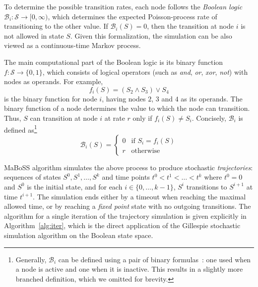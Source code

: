\documentclass[sn-mathphys-num]{sn-jnl}%
\begin{document}
To determine the possible transition rates, each node follows the \emph{Boolean logic} $\mathcal{B}_i: \mathcal{S} \rightarrow [0, \infty)$, which determines the expected Poisson-process rate of transitioning to the other value. If $\mathcal{B}_i(S) = 0$, then the transition at node $i$ is not allowed in state $S$. 
Given this formalization, the simulation can be also viewed as a continuous-time Markov process.

The main computational part of the Boolean logic is its binary function $f: \mathcal{S} \rightarrow \{0, 1\}$, which consists of logical operators (such as \emph{and}, \emph{or}, \emph{xor}, \emph{not}) with nodes as operands. For example, 
\begin{equation}
    f_i(S) = (S_2 \land S_3) \lor S_4 
\end{equation}
is the binary function for node $i$, having nodes $2$, $3$ and $4$ as its operands.
The binary function of a node determines the value to which the node can transition. Thus, $S$ can transition at node $i$ at rate $r$ only if $f_i(S) \neq S_i$. Concisely, $\mathcal{B}_i$ is defined as\footnote{Generally, $\mathcal{B}_i$ can be defined using a pair of binary formulas~\cite{stoll2012continuous}: one used when a node is active and one when it is inactive. This results in a slightly more branched definition, which we omitted for brevity.}
\begin{equation}
    \mathcal{B}_i(S) = \begin{cases}
        0 & \text{if } S_i = f_i(S) \\
        r & \text{otherwise}
    \end{cases}
    \label{eq:transition_rate}
\end{equation}

MaBoSS algorithm simulates the above process to produce stochastic \emph{trajectories}: sequences of states $S^0, S^1, \dots, S^k$ and time points $t^0 < t^1 < \dots < t^k$ where $t^0 = 0$ and $S^0$ is the initial state, and for each $i \in \{0, \dots, k-1\}$, $S^i$ transitions to $S^{i+1}$ at time $t^{i+1}$. The simulation ends either by a timeout when reaching the maximal allowed time, or by reaching a \emph{fixed point} state with no outgoing transitions. The algorithm for a single iteration of the trajectory simulation is given explicitly in Algorithm~\ref{alg:iter}, which is the direct application of the Gillespie stochastic simulation algorithm on the Boolean state space.
\end{document}
